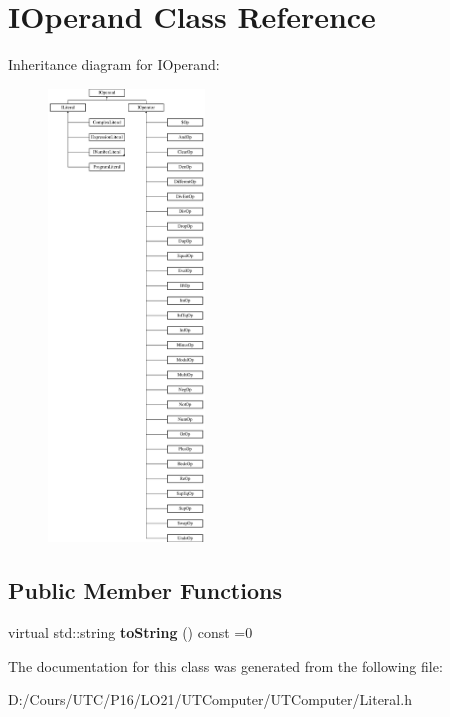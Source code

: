 \hypertarget{class_i_operand}{}\section{I\+Operand Class Reference}
\label{class_i_operand}
Inheritance diagram for I\+Operand\+:\begin{figure}[H]
\begin{center}
\leavevmode
\includegraphics[height=12.000000cm]{class_i_operand}
\end{center}
\end{figure}
\subsection*{Public Member Functions}
\begin{DoxyCompactItemize}
\item 
virtual std\+::string {\bfseries to\+String} () const  =0\hypertarget{class_i_operand_a45b9e5afa570d53821d181efe4d5f333}{}\label{class_i_operand_a45b9e5afa570d53821d181efe4d5f333}

\end{DoxyCompactItemize}


The documentation for this class was generated from the following file\+:\begin{DoxyCompactItemize}
\item 
D\+:/\+Cours/\+U\+T\+C/\+P16/\+L\+O21/\+U\+T\+Computer/\+U\+T\+Computer/Literal.\+h\end{DoxyCompactItemize}
